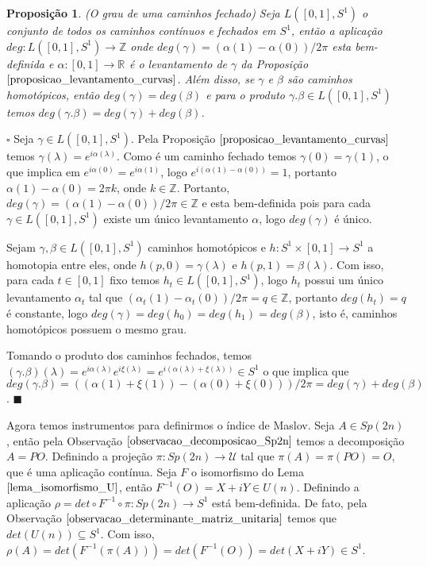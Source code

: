 \documentclass[12pt]{book}
\newtheorem{proposicao}[teorema]{Proposição}
\newenvironment{prova}[1]{$\square$ #1}{\hfill$\blacksquare$}
\newcommand{\gruposimpletico}[1]{Sp(#1)}
\newcommand{\matrizunitaria}[1]{U(#1)}
\newcommand{\real}[1]{\mathbb{R}^{#1}}
\newcommand{\caminhosfechadoscirculo}[2]{L([#1,#2], S^{1})}
\begin{document}
	\begin{proposicao}
		(O grau de uma caminhos fechado) Seja $\caminhosfechadoscirculo{0}{1}$ o conjunto de todos os caminhos contínuos e fechados em $S^{1}$, então a aplicação $deg:\caminhosfechadoscirculo{0}{1} \to \mathbb{Z}$ onde $deg(\gamma) = (\alpha(1)-\alpha(0))/2\pi$ esta bem-definida e $\alpha:[0,1] \to \real{}$ é o levantamento de $\gamma$ da Proposição $\ref{proposicao_levantamento_curvas}$. Além disso, se $\gamma$ e $\beta$ são caminhos homotópicos, então $deg(\gamma)=deg(\beta)$ e para o produto $\gamma.\beta \in \caminhosfechadoscirculo{0}{1}$ temos $deg(\gamma.\beta) = deg(\gamma)+deg(\beta)$.
	\end{proposicao}
	\begin{prova}
		Seja $\gamma \in \caminhosfechadoscirculo{0}{1}$. Pela Proposição $\ref{proposicao_levantamento_curvas}$ temos $\gamma(\lambda) = e^{i\alpha(\lambda)}$. Como é um caminho fechado temos $\gamma(0)=\gamma(1)$, o que implica em $e^{i\alpha(0)}=e^{i\alpha(1)}$, logo $e^{i(\alpha(1)-\alpha(0))} = 1$, portanto $\alpha(1)-\alpha(0) = 2\pi k$, onde $k\in \mathbb{Z}$. Portanto, $deg(\gamma) = (\alpha(1)-\alpha(0))/2\pi \in \mathbb{Z}$ e esta bem-definida pois para cada $\gamma \in \caminhosfechadoscirculo{0}{1}$ existe um único levantamento $\alpha$, logo $deg(\gamma)$ é único.
		
		Sejam $\gamma, \beta \in \caminhosfechadoscirculo{0}{1}$ caminhos homotópicos e $h:S^{1}\times [0,1]\to S^{1}$ a homotopia entre eles, onde $h(p,0) = \gamma(\lambda)$ e $h(p,1) = \beta(\lambda)$. Com isso, para cada $t \in [0,1]$ fixo temos $h_{t} \in \caminhosfechadoscirculo{0}{1}$, logo $h_{t}$ possui um único levantamento $\alpha_{t}$ tal que $(\alpha_{t}(1)-\alpha_{t}(0))/2\pi = q \in \mathbb{Z}$, portanto $deg(h_{t})=q$ é constante, logo $deg(\gamma)=deg(h_{0})=deg(h_{1})=deg(\beta)$, isto é, caminhos homotópicos possuem o mesmo grau. 
		
		Tomando o produto dos caminhos fechados, temos $(\gamma.\beta)(\lambda)= e^{i\alpha(\lambda)}e^{i\xi(\lambda)} = e^{i(\alpha(\lambda)+\xi(\lambda))} \in S^{1}$ o que implica que $deg(\gamma.\beta) = ((\alpha(1)+\xi(1))-(\alpha(0)+\xi(0)))/2\pi = deg(\gamma)+deg(\beta)$.
	\end{prova}
	
	
	Agora temos instrumentos para definirmos o índice de Maslov. Seja $A\in \gruposimpletico{2n}$, então pela Observação $\ref{observacao_decomposicao_Sp2n}$ temos a decomposição $A=PO$. Definindo a projeção $\pi:\gruposimpletico{2n}\to \mathcal{U}$ tal que $\pi(A) = \pi(PO) = O$, que é uma aplicação contínua. Seja $F$ o isomorfismo do Lema $\ref{lema_isomorfismo_U}$, então $F^{-1}(O) = X+iY \in \matrizunitaria{n}$. Definindo a aplicação $\rho = det\circ F^{-1}\circ \pi :\gruposimpletico{2n} \to S^{1}$ está bem-definida. De fato, pela Observação $\ref{observacao_determinante_matriz_unitaria}$ temos que $det(\matrizunitaria{n}) \subseteq S^{1}$. Com isso, $\rho(A) = det(F^{-1}(\pi(A))) = det(F^{-1}(O)) = det(X+iY) \in S^{1}$.
	
\end{document}
